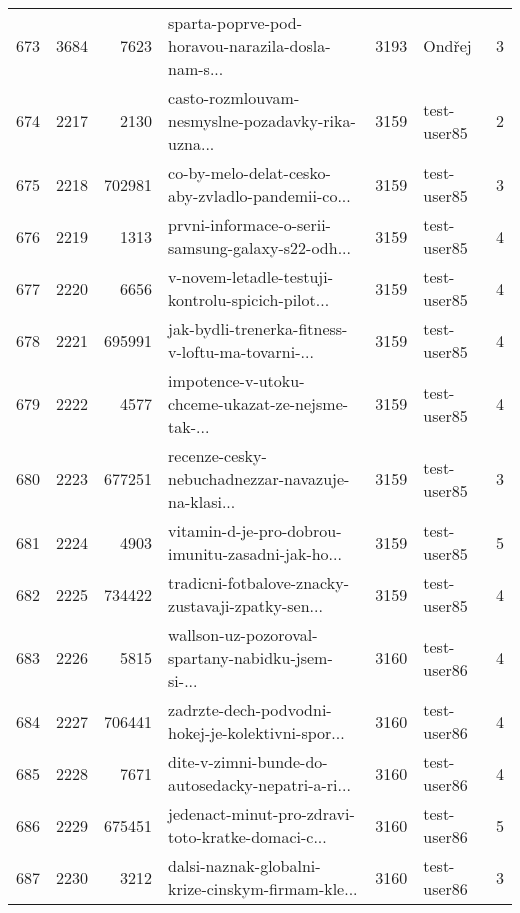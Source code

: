 \begin{tabular}{lrrlrlr}
673  &       3684 &     7623 &  sparta-poprve-pod-horavou-narazila-dosla-nam-s... &     3193 &                       Ondřej &               3 \\
674  &       2217 &     2130 &  casto-rozmlouvam-nesmyslne-pozadavky-rika-uzna... &     3159 &                  test-user85 &               2 \\
675  &       2218 &   702981 &  co-by-melo-delat-cesko-aby-zvladlo-pandemii-co... &     3159 &                  test-user85 &               3 \\
676  &       2219 &     1313 &  prvni-informace-o-serii-samsung-galaxy-s22-odh... &     3159 &                  test-user85 &               4 \\
677  &       2220 &     6656 &  v-novem-letadle-testuji-kontrolu-spicich-pilot... &     3159 &                  test-user85 &               4 \\
678  &       2221 &   695991 &  jak-bydli-trenerka-fitness-v-loftu-ma-tovarni-... &     3159 &                  test-user85 &               4 \\
679  &       2222 &     4577 &  impotence-v-utoku-chceme-ukazat-ze-nejsme-tak-... &     3159 &                  test-user85 &               4 \\
680  &       2223 &   677251 &  recenze-cesky-nebuchadnezzar-navazuje-na-klasi... &     3159 &                  test-user85 &               3 \\
681  &       2224 &     4903 &  vitamin-d-je-pro-dobrou-imunitu-zasadni-jak-ho... &     3159 &                  test-user85 &               5 \\
682  &       2225 &   734422 &  tradicni-fotbalove-znacky-zustavaji-zpatky-sen... &     3159 &                  test-user85 &               4 \\
683  &       2226 &     5815 &  wallson-uz-pozoroval-spartany-nabidku-jsem-si-... &     3160 &                  test-user86 &               4 \\
684  &       2227 &   706441 &  zadrzte-dech-podvodni-hokej-je-kolektivni-spor... &     3160 &                  test-user86 &               4 \\
685  &       2228 &     7671 &  dite-v-zimni-bunde-do-autosedacky-nepatri-a-ri... &     3160 &                  test-user86 &               4 \\
686  &       2229 &   675451 &  jedenact-minut-pro-zdravi-toto-kratke-domaci-c... &     3160 &                  test-user86 &               5 \\
687  &       2230 &     3212 &  dalsi-naznak-globalni-krize-cinskym-firmam-kle... &     3160 &                  test-user86 &               3 \\

\end{tabular}
